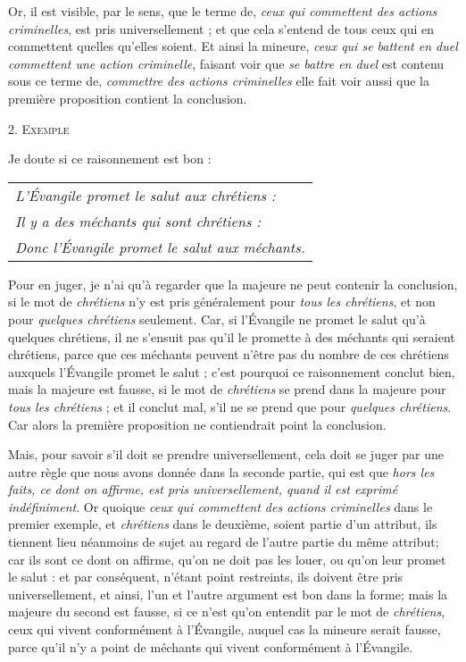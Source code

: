 Or, il est visible, par le sens, que le terme de, \emph{ceux qui commettent des actions criminelles}, est pris universellement ; et que cela s'entend de tous ceux qui en commettent quelles qu'elles soient. Et ainsi la mineure, \emph{ceux qui se battent en duel commettent une action criminelle}, faisant voir que \emph{se battre en duel} est contenu sous ce terme de, \emph{commettre des actions criminelles} elle fait voir aussi que la première proposition contient la conclusion.

\begin{center}{\scshape 2. Exemple}\end{center}

Je doute si ce raisonnement est bon :

\begin{center}
	\begin{tabular}{l}
		\emph{L'Évangile promet le salut aux chrétiens :} \\
		\emph{Il y a des méchants qui sont chrétiens :} \\
		\emph{Donc l'Évangile promet le salut aux méchants.} \\
	\end{tabular}
\end{center}

Pour en juger, je n'ai qu'à regarder que la majeure ne peut contenir la conclusion, si le mot de \emph{chrétiens} n'y est pris généralement pour \emph{tous les chrétiens}, et non pour \emph{quelques chrétiens} seulement. Car, si l'Évangile ne promet le salut qu'à quelques chrétiens, il ne s'ensuit pas qu'il le promette à des méchants qui seraient chrétiens, parce que ces méchants peuvent n'être pas du nombre de ces chrétiens auxquels l'Évangile promet le salut ; c'est pourquoi ce raisonnement conclut bien, mais la majeure est fausse, si le mot de \emph{chrétiens} se prend dans la majeure pour \emph{tous les chrétiens} ; et il conclut mal, s'il ne se prend que pour \emph{quelques chrétiens}. Car alors la première proposition ne contiendrait point la conclusion.

Mais, pour savoir s'il doit se prendre universellement, cela doit se juger par une autre règle que nous avons donnée dans la seconde partie, qui est que \emph{hors les faits, ce dont on affirme, est pris universellement, quand il est exprimé indéfiniment}. Or quoique \emph{ceux qui commettent des actions criminelles} dans le premier exemple, et \emph{chrétiens} dans le deuxième, soient partie d'un attribut, ils tiennent lieu néanmoins de sujet au regard de l'autre partie du même attribut; car ils sont ce dont on affirme, qu'on ne doit pas les louer, ou qu'on leur promet le salut : et par conséquent, n'étant point restreints, ils doivent être pris universellement, et ainsi, l'un et l'autre argument est bon dans la forme; mais la majeure du second est fausse, si ce n'est qu'on entendit par le mot de \emph{chrétiens}, ceux qui vivent conformément à l'Évangile, auquel cas la mineure serait fausse, parce qu'il n'y a point de méchants qui vivent conformément à l'Évangile.

